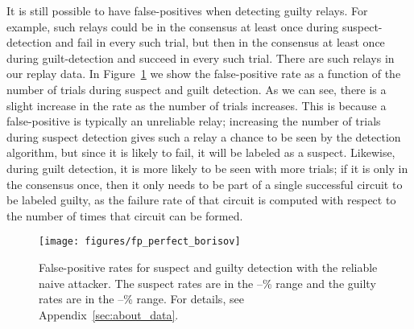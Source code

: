 \documentclass[]{lmcs}
\begin{document}
It is still possible to have false-positives when detecting guilty relays.
For example, such relays could be in the consensus at least
once during suspect-detection and fail in every such trial, but then
in the consensus at least once during guilt-detection and succeed in
every such trial.  There are such relays in our replay data.
In Figure~\ref{fig:suspect_fp_perfect_borisov} we show the
false-positive rate as a function of the number of trials during
suspect and guilt detection.  As we can see, there is a slight increase in the
rate as the number of trials increases.  This is because a
false-positive is typically an unreliable relay; increasing the number
of trials during suspect detection
gives such a relay a chance to be seen by the detection algorithm,
but since it is likely to fail, it will be labeled as a suspect.
Likewise, during guilt detection, it is more likely to be seen with
more trials; if it is only in the consensus once, then it only needs to be
part of a single successful circuit to be labeled guilty, as the failure
rate of that circuit is computed with respect to the number of times
that circuit can be formed.
\begin{figure}
\begin{center}
\texttt{[image: figures/fp\_perfect\_borisov]}
\end{center}
\caption{False-positive rates for suspect and guilty detection with
the reliable naive attacker.  The suspect rates are in the --\% range
and the guilty rates are in the --\% range.  
For details, see Appendix~\ref{sec:about_data}.}
\label{fig:suspect_fp_perfect_borisov}
\end{figure}
\end{document}
